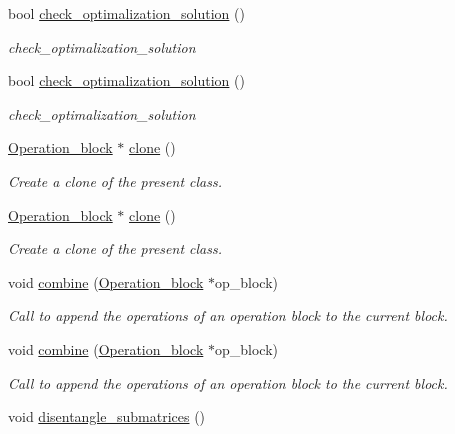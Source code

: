 \begin{DoxyCompactItemize}
bool \hyperlink{class_decomposition___base_aa01a8d70b76215a235cb0d71894b2595}{check\+\_\+optimalization\+\_\+solution} ()
\begin{DoxyCompactList}\small\item\em check\+\_\+optimalization\+\_\+solution \end{DoxyCompactList}\item 
bool \hyperlink{class_decomposition___base_aa01a8d70b76215a235cb0d71894b2595}{check\+\_\+optimalization\+\_\+solution} ()
\begin{DoxyCompactList}\small\item\em check\+\_\+optimalization\+\_\+solution \end{DoxyCompactList}\item 
\hyperlink{class_operation__block}{Operation\+\_\+block} $\ast$ \hyperlink{class_operation__block_a2aa75d20b21c3b5802730c0abe54db5e}{clone} ()
\begin{DoxyCompactList}\small\item\em Create a clone of the present class. \end{DoxyCompactList}\item 
\hyperlink{class_operation__block}{Operation\+\_\+block} $\ast$ \hyperlink{class_operation__block_af5d1f81be3a54eada1de293d1e9877c5}{clone} ()
\begin{DoxyCompactList}\small\item\em Create a clone of the present class. \end{DoxyCompactList}\item 
void \hyperlink{class_operation__block_a60062cf6f48ebfdcaae9db3367a66147}{combine} (\hyperlink{class_operation__block}{Operation\+\_\+block} $\ast$op\+\_\+block)
\begin{DoxyCompactList}\small\item\em Call to append the operations of an operation block to the current block. \end{DoxyCompactList}\item 
void \hyperlink{class_operation__block_a60062cf6f48ebfdcaae9db3367a66147}{combine} (\hyperlink{class_operation__block}{Operation\+\_\+block} $\ast$op\+\_\+block)
\begin{DoxyCompactList}\small\item\em Call to append the operations of an operation block to the current block. \end{DoxyCompactList}\item 
void \hyperlink{class_sub___matrix___decomposition_a8522d56a01b94f51e477c01ad917a5e3}{disentangle\+\_\+submatrices} ()

\end{DoxyCompactItemize}
